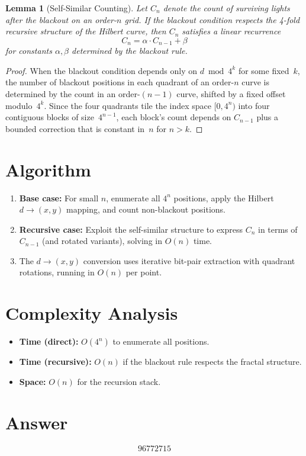 \documentclass[11pt]{article}
\newtheorem{lemma}[theorem]{Lemma}
\begin{document}
\begin{lemma}[Self-Similar Counting]
Let $C_n$ denote the count of surviving lights after the blackout on an order-$n$ grid. If the blackout condition respects the 4-fold recursive structure of the Hilbert curve, then $C_n$ satisfies a linear recurrence
\[
C_n = \alpha \cdot C_{n-1} + \beta
\]
for constants $\alpha, \beta$ determined by the blackout rule.
\end{lemma}

\begin{proof}
When the blackout condition depends only on $d \bmod 4^k$ for some fixed~$k$, the number of blackout positions in each quadrant of an order-$n$ curve is determined by the count in an order-$(n-1)$ curve, shifted by a fixed offset modulo~$4^k$. Since the four quadrants tile the index space $[0, 4^n)$ into four contiguous blocks of size~$4^{n-1}$, each block's count depends on $C_{n-1}$ plus a bounded correction that is constant in~$n$ for $n > k$.
\end{proof}

\section{Algorithm}

\begin{enumerate}
    \item \textbf{Base case:} For small $n$, enumerate all $4^n$ positions, apply the Hilbert $d \to (x,y)$ mapping, and count non-blackout positions.
    \item \textbf{Recursive case:} Exploit the self-similar structure to express $C_n$ in terms of $C_{n-1}$ (and rotated variants), solving in $O(n)$ time.
    \item The $d \to (x,y)$ conversion uses iterative bit-pair extraction with quadrant rotations, running in $O(n)$ per point.
\end{enumerate}

\section{Complexity Analysis}
\begin{itemize}
    \item \textbf{Time (direct):} $O(4^n)$ to enumerate all positions.
    \item \textbf{Time (recursive):} $O(n)$ if the blackout rule respects the fractal structure.
    \item \textbf{Space:} $O(n)$ for the recursion stack.
\end{itemize}

\section{Answer}

\[
\boxed{96772715}
\]
\end{document}
